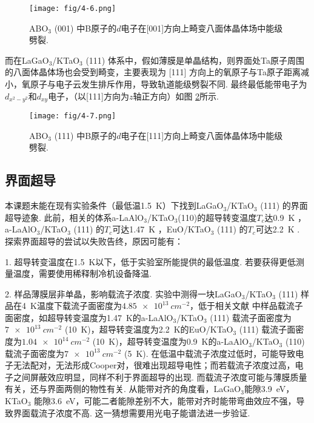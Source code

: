 \documentclass[12pt,a4paper,openany,twoside,UTF-8]{book}
\begin{document}
\begin{figure}[htbp]
\centering
\texttt{[image: fig/4-6.png]}
\caption{ABO$_3$ (001) 中B原子的$d$电子在[001]方向上畸变八面体晶体场中能级劈裂.}
\label{fig:4-6} 
\end{figure}

而在LaGaO$_3$/KTaO$_3$ (111) 体系中，假如薄膜是单晶结构，则界面处Ta原子周围的八面体晶体场也会受到畸变，主要表现为 [111] 方向上的氧原子与Ta原子距离减小，氧原子与电子云发生排斥作用，导致轨道能级劈裂不同. 最终最低能带电子为$d_{x^2-y^2}$和$d_{xy}$电子，（以[111]方向为$z$轴正方向）如图 \ref{fig:4-7}所示.

\begin{figure}[htbp]
\centering
\texttt{[image: fig/4-7.png]}
\caption{ABO$_3$ (111) 中B原子的$d$电子在[111]方向上畸变八面体晶体场中能级劈裂.}
\label{fig:4-7} 
\end{figure}

\subsection{界面超导}
本课题未能在现有实验条件（最低温\SI{1.5}{K}）下找到LaGaO$_3$/KTaO$_3$ (111) 的界面超导迹象. 此前，相关的体系a-LaAlO$_3$/KTaO$_3$(110)的超导转变温度$T_c$达\SI{0.9}{K} \cite{ref21}，a-LaAlO$_3$/KTaO$_3$ (111) 的$T_c$可达\SI{1.47}{K} \cite{ref22}，EuO/KTaO$_3$ (111) 的$T_c$可达\SI{2.2}{K} \cite{ref22}. 探索界面超导的尝试以失败告终，原因可能有：

1. 超导转变温度在\SI{1.5}{K}以下，低于实验室所能提供的最低温度. 若要获得更低测量温度，需要使用稀释制冷机设备降温.

2. 样品薄膜层非单晶，影响载流子浓度. 实验中测得一块LaGaO$_3$/KTaO$_3$ (111) 样品在\SI{4}{K}温度下载流子面密度为$\SI{4.85e13}{cm^{-2}}$，低于相关文献 \cite{ref21, ref22}中样品载流子面密度，如超导转变温度为\SI{1.47}{K}的a-LaAlO$_3$/KTaO$_3$ (111) 载流子面密度为 $\SI{7e13}{cm^{-2}}$ (\SI{10}{K})，超导转变温度为\SI{2.2}{K}的EuO/KTaO$_3$ (111) 载流子面密度为$\SI{1.04e14}{cm^{-2}}$ (\SI{10}{K})，超导转变温度为\SI{0.9}{K}的a-LaAlO$_3$/KTaO$_3$ (110) 载流子面密度为$\SI{7e13}{cm^{-2}}$ (\SI{5}{K}). 在低温中载流子浓度过低时，可能导致电子无法配对，无法形成Cooper对，很难出现超导电性；而若载流子浓度过高，电子之间屏蔽效应明显，同样不利于界面超导的出现. 而载流子浓度可能与薄膜质量有关，还与界面两侧的物性有关. 从能带对齐的角度看，LaGaO$_3$能隙\SI{3.9}{eV}，KTaO$_3$ 能隙\SI{3.6}{eV}，可能二者能隙差别不大，能带对齐时能带弯曲效应不强，导致界面载流子浓度不高. 这一猜想需要用光电子能谱法进一步验证.
\end{document}
